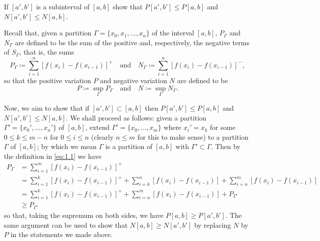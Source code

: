 \begin{problem}
  If $[a',b']$ is a subinterval of $[a,b]$ show that $P[a',b']\leq P[a,b]$
  and $N[a',b']\leq N[a,b]$.
\end{problem}
\begin{solution}
  Recall that, given a partition $\Gamma=\{x_0,x_1,\ldots,x_n\}$ of the
  interval $[a,b]$, $P_\Gamma$ and $N_\Gamma$ are defined to be the sum of
  the positive and, respectively, the negative terms of $S_\Gamma$, that
  is, the sums
  \begin{equation}
    \label{eq:1.1}
    P_\Gamma\coloneq\sum_{i=1}^n\left[f(x_i)-f(x_{i-1})\right]^+
    \quad\text{and}\quad
    N_\Gamma\coloneq\sum_{i=1}^n\left[f(x_i)-f(x_{i-1})\right]^-,
  \end{equation}
  so that the positive variation $P$ and negative variation $N$ are defined
  to be
  \[
    P\coloneq\sup_\Gamma P_\Gamma \quad\text{and}\quad N\coloneq\sup_\Gamma
    N_\Gamma.
  \]

  Now, we aim to show that if $[a',b']\subset[a,b]$ then
  $P[a',b']\leq P[a,b]$ and $N[a',b']\leq N[a,b]$.  We shall proceed as
  follows: given a partition $\Gamma'=\{x_0',\ldots,x_n'\}$ of $[a,b]$,
  extend $\Gamma'=\{x_0,\ldots,x_m\}$ where $x_i'=x_k$ for some
  $0\leq k\leq m-n$ for $0\leq i\leq n$ (clearly $n\leq m$ for this to make
  sense) to a partition $\Gamma$ of $[a,b]$; by which we mean $\Gamma$ is a
  partition of $[a,b]$ with $\Gamma'\subset\Gamma$. Then by the definition
  in \eqref{eq:1.1} we have
  \begin{align*}
    P_\Gamma
    &=\sum_{i=1}^m\left[f(x_i)-f(x_{i-1})\right]^+\\
    &=\sum_{i=1}^k\left[f(x_i)-f(x_{i-1})\right]^+
      +\sum_{i=k}^n\left[f(x_i)-f(x_{i-1})\right]
      +\sum_{i=n}^m\left[f(x_i)-f(x_{i-1})\right]\\
    &=\sum_{i=1}^k\left[f(x_i)-f(x_{i-1})\right]^+
      +\sum_{i=n}^m\left[f(x_i)-f(x_{i-1})\right]
      +P_{\Gamma'}\\
    &\geq P_{\Gamma'}
  \end{align*}
  so that, taking the supremum on both sides, we have
  $P[a,b]\geq P[a',b']$. The same argument can be used to show that
  $N[a,b]\geq N[a',b']$ by replacing $N$ by $P$ in the statements we made
  above.
\end{solution}

